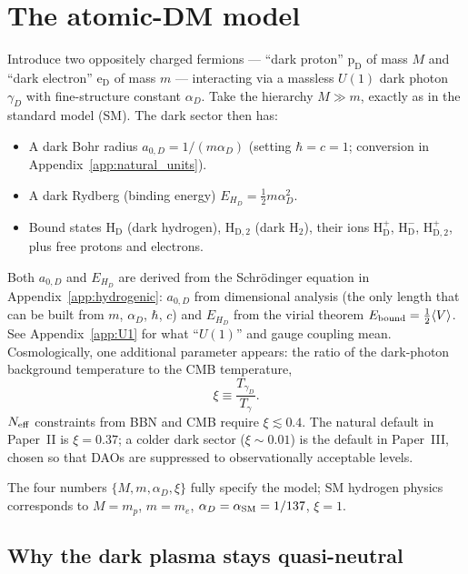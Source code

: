 \documentclass[12pt]{article}
\newcommand{\HD}{\mathrm{H_D}}
\newcommand{\HDp}{\mathrm{H_D^+}}
\newcommand{\HDm}{\mathrm{H_D^-}}
\newcommand{\HDtwo}{\mathrm{H_{D,2}}}
\newcommand{\HDtwop}{\mathrm{H_{D,2}^+}}
\newcommand{\pD}{\mathrm{p_D}}
\newcommand{\eD}{\mathrm{e_D}}
\newcommand{\gD}{\gamma_D}
\newcommand{\alphaD}{\alpha_D}
\newcommand{\aD}{a_{0,D}}
\begin{document}
\section{The atomic-DM model}
\label{sec:model}

Introduce two oppositely charged fermions --- ``dark proton'' $\pD$ of
mass $M$ and ``dark electron'' $\eD$ of mass $m$ --- interacting via a
massless $U(1)$ dark photon $\gD$ with fine-structure constant
$\alphaD$.  Take the hierarchy $M \gg m$, exactly as in the standard
model (SM).  The dark sector then has:
%
\begin{itemize}
  \item A dark Bohr radius $\aD = 1/(m \alphaD)$ (setting
        $\hbar=c=1$; conversion in Appendix~\ref{app:natural_units}).
  \item A dark Rydberg (binding energy)
        $E_{H_D} = \tfrac{1}{2}m\alphaD^2$.
  \item Bound states $\HD$ (dark hydrogen), $\HDtwo$ (dark H$_2$),
        their ions $\HDp$, $\HDm$, $\HDtwop$, plus free protons and
        electrons.
\end{itemize}
%
Both $\aD$ and $E_{H_D}$ are derived from the Schr\"odinger equation
in Appendix~\ref{app:hydrogenic}: $\aD$ from dimensional analysis
(the only length that can be built from $m$, $\alphaD$, $\hbar$, $c$)
and $E_{H_D}$ from the virial theorem
$E_{\rm bound} = \tfrac{1}{2}\langle V\rangle$.  See
Appendix~\ref{app:U1} for what ``$U(1)$'' and gauge coupling mean.
%
Cosmologically, one additional parameter appears: the ratio of the
dark-photon background temperature to the CMB temperature,
%
\begin{equation}
  \xi \equiv \frac{T_{\gD}}{T_\gamma}.
\end{equation}
%
$N_{\rm eff}$ constraints from BBN and CMB require $\xi \lesssim 0.4$.
The natural default in Paper~II is $\xi = 0.37$; a colder dark sector
($\xi \sim 0.01$) is the default in Paper~III, chosen so that DAOs are
suppressed to observationally acceptable levels.

The four numbers $\{M, m, \alphaD, \xi\}$ fully specify the model; SM
hydrogen physics corresponds to $M = m_p$, $m = m_e$,
$\alphaD = \alpha_{\rm SM} = 1/137$, $\xi = 1$.

\subsection{Why the dark plasma stays quasi-neutral}
\label{sec:quasi_neutral}
\end{document}
